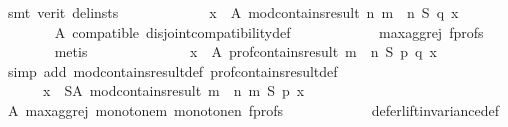 \begin{isabellebody}
\ {\isacharparenleft}{\kern0pt}smt\ {\isacharparenleft}{\kern0pt}verit{\isacharcomma}{\kern0pt}\ del{\isacharunderscore}{\kern0pt}insts{\isacharparenright}{\kern0pt}{\isacharparenright}{\kern0pt}\isanewline
\ \ \ \ \isamarkupfalse%
\ \isamarkupfalse%
\isanewline
\ \ \ \ \ \ {\isachardoublequoteopen}{\isasymforall}x\ {\isasymin}\ A{\isachardot}{\kern0pt}\ mod{\isacharunderscore}{\kern0pt}contains{\isacharunderscore}{\kern0pt}result\ n\ {\isacharparenleft}{\kern0pt}m\ {\isasymparallel}\isactrlsub {\isasymup}\ n{\isacharparenright}{\kern0pt}\ S\ q\ x{\isachardoublequoteclose}\isanewline
\ \ \ \ \ \ \isamarkupfalse%
\ A\ compatible\ disjoint{\isacharunderscore}{\kern0pt}compatibility{\isacharunderscore}{\kern0pt}def\isanewline
\ \ \ \ \ \ \ \ \ \ \ \ max{\isacharunderscore}{\kern0pt}agg{\isacharunderscore}{\kern0pt}rej{}\ f{\isacharunderscore}{\kern0pt}profs\isanewline
\ \ \ \ \ \ \isamarkupfalse%
\ metis\isanewline
\ \ \ \ \isamarkupfalse%
\ \isamarkupfalse%
\ {}{}{\isacharcolon}{\kern0pt}\isanewline
\ \ \ \ \ \ {\isachardoublequoteopen}{\isasymforall}x\ {\isasymin}\ A{\isachardot}{\kern0pt}\ prof{\isacharunderscore}{\kern0pt}contains{\isacharunderscore}{\kern0pt}result\ {\isacharparenleft}{\kern0pt}m\ {\isasymparallel}\isactrlsub {\isasymup}\ n{\isacharparenright}{\kern0pt}\ S\ p\ q\ x{\isachardoublequoteclose}\isanewline
\ \ \ \ \ \ \isamarkupfalse%
\ {\isacharparenleft}{\kern0pt}simp\ add{\isacharcolon}{\kern0pt}\ mod{\isacharunderscore}{\kern0pt}contains{\isacharunderscore}{\kern0pt}result{\isacharunderscore}{\kern0pt}def\ prof{\isacharunderscore}{\kern0pt}contains{\isacharunderscore}{\kern0pt}result{\isacharunderscore}{\kern0pt}def{\isacharparenright}{\kern0pt}\isanewline
\ \ \ \ \isamarkupfalse%
\isanewline
\ \ \ \ \ \ {\isachardoublequoteopen}{\isasymforall}x\ {\isasymin}\ S{\isacharminus}{\kern0pt}A{\isachardot}{\kern0pt}\ mod{\isacharunderscore}{\kern0pt}contains{\isacharunderscore}{\kern0pt}result\ {\isacharparenleft}{\kern0pt}m\ {\isasymparallel}\isactrlsub {\isasymup}\ n{\isacharparenright}{\kern0pt}\ m\ S\ p\ x{\isachardoublequoteclose}\isanewline
\ \ \ \ \ \ \isamarkupfalse%
\ A\ max{\isacharunderscore}{\kern0pt}agg{\isacharunderscore}{\kern0pt}rej{}\ monotone{\isacharunderscore}{\kern0pt}m\ monotone{\isacharunderscore}{\kern0pt}n\ f{\isacharunderscore}{\kern0pt}profs\isanewline
\ \ \ \ \ \ \ \ \ \ \ \ defer{\isacharunderscore}{\kern0pt}lift{\isacharunderscore}{\kern0pt}invariance{\isacharunderscore}{\kern0pt}def\isanewline

\end{isabellebody}
